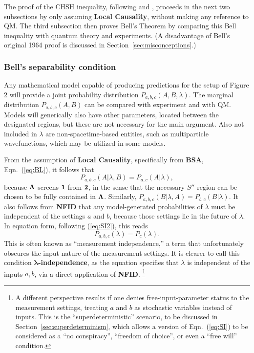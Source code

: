 \documentclass[onecolumn, nofootinbib, 12pt]{revtex4-1}
\newcommand{\eq}[1]{{Eqn.~(\ref{#1})}}
\begin{document}
The proof of the CHSH inequality, following \textcite{bell1976b,bell1981,bell1990} and \textcite{peres1978}, proceeds in the next two subsections by only assuming {\bf Local Causality}, without making any reference to QM\@.  The third subsection then proves Bell's Theorem by comparing this Bell inequality with quantum theory and experiments. (A disadvantage of Bell's original 1964 proof is discussed in Section~\ref{sec:misconceptions}.) 

\subsubsection{Bell's separability condition}

Any mathematical model capable of producing predictions for the setup of Figure 2 will provide a joint probability distribution $P_{a,b,c}(A,B,\lambda)$.  The marginal distribution $P_{a,b,c}(A,B)$ can be compared with experiment and with QM\@.  Models will generically also have other parameters, located between the designated regions, but these are not necessary for the main argument.  Also
not included in $\lambda$ are non-spacetime-based entities, such as multiparticle wavefunctions, which may be utilized in some models. 

From the assumption of {\bf Local Causality}, specifically from {\bf BSA}, \eq{eq:BL}, it follows that 
\begin{equation}
\label{eq:BL1}
P_{a,b,c}(A|\lambda,B) = P_{a,c}(A| \lambda),
\end{equation} 
because $\bf{\Lambda}$ screens $\bf{1}$ from $\bf{2}$, in the sense that the necessary $S''$ region can be chosen to be fully contained in $\bf{\Lambda}$.  Similarly, $P_{a,b,c}(B|\lambda,A) = P_{b,c}(B|\lambda)$.  It also follows from {\bf NFID} that any model-generated probabilities of $\lambda$ must be independent of the settings $a$ and $b$, because those settings lie in the future of $\lambda$. In equation form, following (\ref{eq:SI2}), this reads
\begin{equation}
\label{eq:SI}
P_{a,b,c}(\lambda)=P_c(\lambda).
\end{equation}
This is often known as ``measurement independence,'' a term that unfortunately obscures the input nature of the measurement settings.  It is clearer to call this condition {\bf $\bm{\lambda}$-independence}, as the equation specifies that $\lambda$ is independent of the inputs $a,b$, via a direct application of {\bf NFID}.%
\footnote{
\label{fn:superdet}%
A different perspective results if one denies free-input-parameter status to the measurement settings, treating $a$ and $b$ as stochastic variables instead of inputs.  This is the ``superdeterministic'' scenario, to be discussed in Section~\ref{sec:superdeterminism}, which allows a version of Eqn.~(\ref{eq:SI}) to be considered as a ``no conspiracy'', ``freedom of choice'', or even a ``free will'' condition.}
\end{document}
